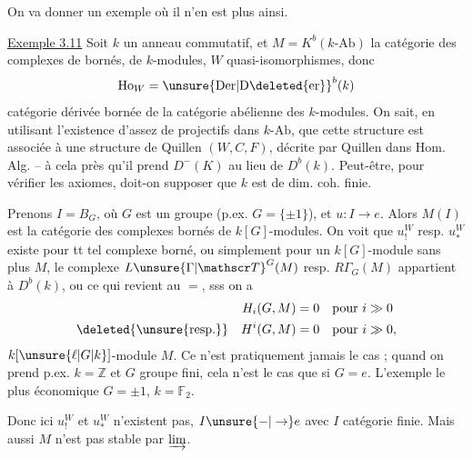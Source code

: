 On va donner un exemple où il n'en
est plus ainsi.

\uline{Exemple 3.11} Soit $k$ un anneau
commutatif, et  $M=K^b(k\text{-}\mathrm{Ab})$
la catégorie des complexes de 
bornés, de $k$-modules, $W$  
quasi-isomorphismes, donc
\[
 \mathrm{Ho}_W=\unsure{\mathrm{Der}|\mathrm{D}\deleted{\mathrm{er}}}^{b}(k)
\]
catégorie dérivée bornée de la catégorie
abélienne des $k$-modules. On sait,
en utilisant l'existence d'assez de
projectifs dans $k\text{-}\mathrm{Ab}$, que cette
structure est associée à une structure
de Quillen  $(W,C,F)$, décrite par Quillen
dans Hom. Alg. -- à cela près qu'il  prend
$D^-(K)$ au lieu de $D^b(k)$. Peut-être,
pour vérifier les axiomes, doit-on supposer
que $k$ est de dim. coh. finie.

Prenons $I=B_G$, où $G$ est un
groupe (p.ex. $G=\{\pm1\}$),  et
$u:I\to e$. Alors $M(I)$ est la
catégorie des complexes bornés de
$k[G]$-modules. On voit que
$u^W_!$ resp. $u^W_*$ existe  pour tt
tel complexe borné, ou simplement pour
un $k[G]$-module sans plus $M$,
le complexe $L\unsure{\Gamma|\mathscr T}^{G}(M)$ resp. $R\Gamma_G(M)$
 appartient à $D^b(k)$, ou ce
qui revient au $=$, sss on a
\[
 \begin{aligned}
 H_i(G,M)&=0 &&\text{pour }i\gg0\\
 \text{\deleted{\unsure{resp.}}}\quad H^i(G,M)&=0 &&\text{pour }i\gg0,
 \end{aligned}
\]
 $k[\unsure{\ell|G|k}]$-module $M$. Ce n'est
pratiquement jamais le cas ;  quand
on prend p.ex. $k=\mathbb Z$ et $G$ groupe fini,
cela n'est le cas que si $G=e$. L'exemple
le plus économique   $G=\pm1$, $k=\mathbb F_2$.

Donc ici $u^W_!$ et $u^W_*$ n'existent pas, 
$I\unsure{-|\to}e$ avec $I$ catégorie finie. Mais
aussi $M$ n'est pas stable par  $\varinjlim$.

